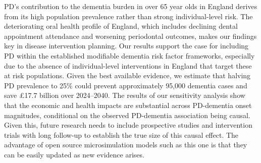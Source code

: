 \documentclass[11pt,a4paper]{article}
\begin{document}
PD's contribution to the dementia burden in over 65 year olds in England derives from its high population prevalence rather than strong individual-level risk. The deteriorating oral health profile of England, which includes declining dental appointment attendance and worsening periodontal outcomes, makes our findings key in disease intervention planning. Our results support the case for including PD within the established modifiable dementia risk factor frameworks, especially due to the absence of individual-level interventions in England that target these at risk populations. Given the best available evidence, we estimate that halving PD prevalence to 25\% could prevent approximately 95,000 dementia cases and save \pounds17.7 billion over 2024--2040. The results of our sensitivity analysis show that the economic and health impacts are substantial across PD-dementia onset magnitudes, conditional on the observed PD-dementia association being causal. Given this, future research needs to include prospective studies and intervention trials with long follow-up to establish the true size of this causal effect. The advantage of open source microsimulation models such as this one is that they can be easily updated as new evidence arises.
\end{document}
